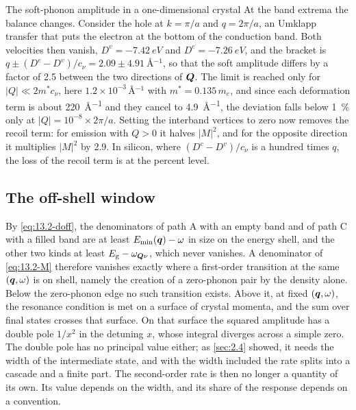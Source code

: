 \begin{workedexample}{The soft-phonon amplitude in a one-dimensional crystal}
At the band extrema the balance changes. Consider the hole at $k = \pi/a$ and $q = 2\pi/a$, an Umklapp transfer that puts the electron at the bottom of the conduction band. Both velocities then vanish, $D^v = \SI{-7.42}{eV}$ and $D^c = \SI{-7.26}{eV}$, and the bracket is $q \pm (D^c - D^v)/c_\nu = 2.09 \pm \SI{4.91}{\angstrom^{-1}}$, so that the soft amplitude differs by a factor of 2.5 between the two directions of $\bm{Q}$. The limit is reached only for $|Q| \ll 2m^*c_\nu$, here $1.2\times10^{-3}\,\si{\angstrom^{-1}}$ with $m^* = 0.135\,m_e$, and since each deformation term is about \SI{220}{\angstrom^{-1}} and they cancel to \SI{4.9}{\angstrom^{-1}}, the deviation falls below \SI{1}{\percent} only at $|Q| = 10^{-8}\times2\pi/a$. Setting the interband vertices to zero now removes the recoil term: for emission with $Q > 0$ it halves $|M|^2$, and for the opposite direction it multiplies $|M|^2$ by 2.9. In silicon, where $(D^c - D^v)/c_\nu$ is a hundred times $q$, the loss of the recoil term is at the percent level.
\end{workedexample}

\subsection{The off-shell window}

By \cref{eq:13.2-doff}, the denominators of path A with an empty band and of path C with a filled band are at least $E_{\mathrm{min}}(\bm{q}) - \omega$ in size on the energy shell, and the other two kinds at least $E_{\mathrm{g}} - \omega_{\bm{Q}\nu}$, which never vanishes. A denominator of \cref{eq:13.2-M} therefore vanishes exactly where a first-order transition at the same $(\bm{q},\omega)$ is on shell, namely the creation of a zero-phonon pair by the density alone. Below the zero-phonon edge no such transition exists. Above it, at fixed $(\bm{q},\omega)$, the resonance condition is met on a surface of crystal momenta, and the sum over final states crosses that surface. On that surface the squared amplitude has a double pole $1/x^2$ in the detuning $x$, whose integral diverges across a simple zero. The double pole has no principal value either; as \cref{sec:2.4} showed, it needs the width of the intermediate state, and with the width included the rate splits into a cascade and a finite part. The second-order rate is then no longer a quantity of its own. Its value depends on the width, and its share of the response depends on a convention.

